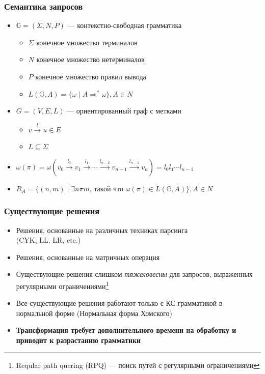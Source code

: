 \documentclass[xcolor=table,english,russian]{beamer}
\begin{document}
\begin{frame}[fragile] \frametitle{Семантика запросов}
    \begin{itemize}
        \item $\mathbb{G} = (\Sigma, N, P)$ --- контекстно-свободная грамматика
        \begin{itemize}
            \item $\Sigma$ конечное множество терминалов
            \item $N$ конечное множество нетерминалов
            \item $P$ конечное множество правил вывода
            \item $L(\mathbb{G},A) = \{ \omega \mid A \Rightarrow^* \omega \}, A \in N$
        \end{itemize}
        \item $G = (V,E,L)$ --- ориентированный граф с метками
        \begin{itemize}
            \item $v \xrightarrow{l} u \in E$
            \item $L \subseteq \Sigma$
        \end{itemize}
        \item $\omega(\pi) = \omega(v_0 \xrightarrow{l_0} v_1 \xrightarrow{l_1} \cdots \xrightarrow{l_{n-2}} v_{n-1} \xrightarrow{l_{n-1}} v_n) = l_0 l_1 \cdots l_{n-1}$
        \item $R_A = \{ (n, m) \mid \exists n \pi m$, такой что $\omega(\pi) \in L(\mathbb{G},A)\}, A \in N$
    \end{itemize}
\end{frame}

\begin{frame}[fragile] \frametitle{Существующие решения}
    \begin{itemize}
        \item Решения, основанные на различных техниках парсинга \\ (CYK, LL, LR, etc.)
        \item Решения, основанные на матричных операция
        \item Существующие решения слишком \textit{тяжеловесны} для запросов, выраженных регулярными ограничениями\footnote{Reqular path quering (RPQ) --- поиск путей с регулярными ограничениями}
        \item Все существующие решения работают только с КС грамматикой в нормальной форме (Нормальная форма Хомского)
        \item \textbf{Трансформация требует дополнительного времени на обработку и приводит к разрастанию грамматики }
    \end{itemize}
\end{frame}
\end{document}
